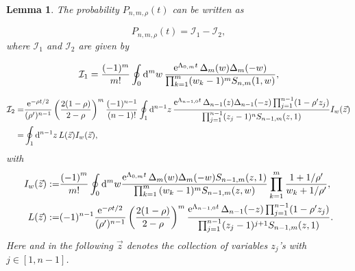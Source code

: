 \documentclass[cmp]{svjour}
\numberwithin{theorem}{section}
\numberwithin{equation}{section}
\DeclareMathOperator{\e}{e}
\def\dd{{\rm d}}
\newtheorem{lemman}[theorem]{Lemma}
\begin{document}
\medskip

\begin{lemman}
\label{lem:prob2term}
The probability $P_{n,m,\rho}(t)$ can be written as

\begin{equation}
\label{eq:prob2termb}
P_{n,m,\rho}(t)  = \mathcal{I}_1 - \mathcal{I}_2,
\end{equation}
where $\mathcal{I}_1$ and $\mathcal{I}_2$ are given by

\begin{equation}
\label{eq:prob2term1}
\mathcal{I}_1 =  \frac{ (-1)^m }{m!}\oint_{ 0} \dd^m w\, \frac{  \e^{\Lambda_{0,m} t} \Delta_m(w) \Delta_m(-w)  }
{ \prod_{k=1}^m (w_k-1)^{m} S_{n,m}(1,w)} ,
\end{equation}


\begin{align}
\label{eq:prob2term2}
\mathcal{I}_2
=&
\frac{\e^{-\rho t/2}}{(\rho')^{n-1}} \left(\frac{2(1-\rho)}{2-\rho}\right)^m \frac{(-1)^{n-1}}{(n-1)!}  \oint_{1} \dd^{n-1} z\,  \frac{ \e^{\Lambda_{n-1,0} t} \Delta_{n-1}(z) \Delta_{n-1}(-z)  \prod_{j=1}^{n-1}(1-\rho' z_j)}
{\prod_{j=1}^{n-1} (z_j-1)^n S_{n-1,m}(z,1) }
I_w(\vec{z})\\
=& \oint_{1} \dd^{n-1} z\,  L(\vec{z})
I_w (\vec{z}),
\label{I2 Iz antisym}
\end{align}
with
\begin{align}
I_w (\vec{z}) := & \frac{{(-1)}^m}{m!}
\oint_{0}
\dd^m w
\frac{\e^{\Lambda_{0,m}t} \Delta_{m}(w) \Delta_m(-w) S_{n-1,m}(z,1) }{\prod_{k=1}^{m}{ (w_k-1)^m} S_{n-1,m}(z,w) }
\prod_{k=1}^{m}\frac{1+1/\rho'}{w_k+1/\rho'},
\label{Iw} \\
L(\vec{z}) := &(-1)^{n-1} \frac{\e^{-\rho t/2}}{(\rho')^{n-1}  } \left(\frac{2(1-\rho)}{2-\rho}\right)^m  \frac{ \e^{\Lambda_{n-1,0} t} \Delta_{n-1}(-z)  \prod_{j=1}^{n-1}(1-\rho' z_j)}
{\prod_{j=1}^{n-1} (z_j-1)^{j+1} S_{n-1,m}(z,1) }. \label{def:L(z)} 
\end{align}
Here and in the following $\vec{z}$ denotes the collection of variables $z_j$'s with $j\in [1,n-1]$.
\end{lemman}
\end{document}
